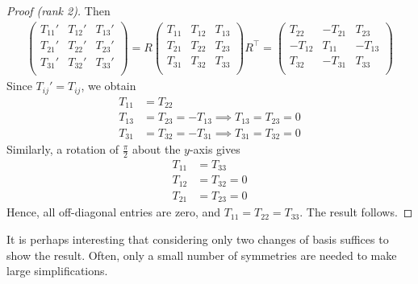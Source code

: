\documentclass{../template/note}
\begin{document}
\begin{proof}[Proof (rank 2)]
        Then
        \begin{align*}
            \begin{pmatrix}
                T_{11}' & T_{12}' & T_{13}' \\
                T_{21}' & T_{22}' & T_{23}' \\
                T_{31}' & T_{32}' & T_{33}' \\
            \end{pmatrix} = R \begin{pmatrix}
                T_{11} & T_{12} & T_{13} \\
                T_{21} & T_{22} & T_{23} \\
                T_{31} & T_{32} & T_{33} \\
            \end{pmatrix} R^\intercal = \begin{pmatrix}
                T_{22} & -T_{21} & T_{23} \\
                -T_{12} & T_{11} & -T_{13} \\
                T_{32} & -T_{31} & T_{33} \\
            \end{pmatrix}
        \end{align*}
        Since \(T_{ij}' = T_{ij}\), we obtain
        \begin{align*}
            T_{11} &= T_{22} \\
            T_{13} &= T_{23} = -T_{13} \implies T_{13} = T_{23} = 0 \\
            T_{31} &= T_{32} = -T_{31} \implies T_{31} = T_{32} = 0
        \end{align*}
        Similarly, a rotation of \(\frac \pi 2\) about the \(y\)-axis gives
        \begin{align*}
            T_{11} &= T_{33} \\
            T_{12} &= T_{32} = 0 \\
            T_{21} &= T_{23} = 0
        \end{align*}
        Hence, all off-diagonal entries are zero, and \(T_{11} = T_{22} = T_{33}\). The result follows.
    \end{proof}

    \begin{remark*}
        It is perhaps interesting that considering only two changes of basis suffices to show the result. Often, only a small number of symmetries are needed to make large simplifications.
    \end{remark*}
    
\end{document}
